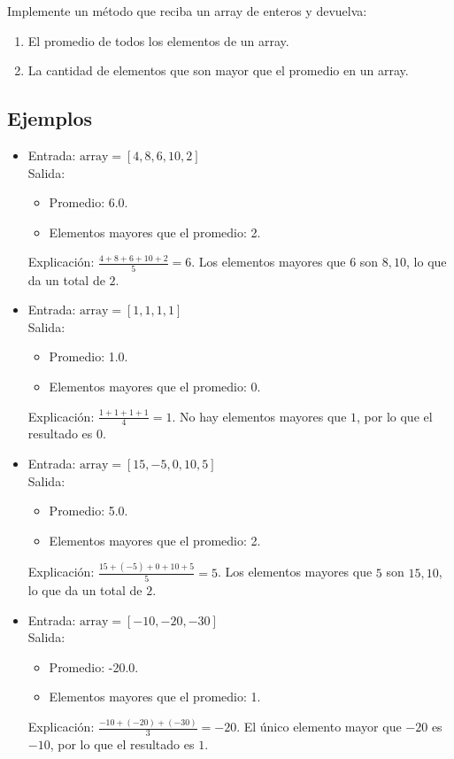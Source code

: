 Implemente un método que reciba un array de enteros y devuelva: 
\begin{enumerate}
    \item El promedio de todos los elementos de un array.
    \item La cantidad de elementos que son mayor que el promedio en un array.
\end{enumerate}
\subsection*{Ejemplos}
\begin{itemize}
    \item Entrada: \( \text{array} = [4, 8, 6, 10, 2] \)\\
    Salida: 
    \begin{itemize}
        \item Promedio: 6.0.
        \item Elementos mayores que el promedio: 2.
    \end{itemize}
    Explicación: \(\frac{4 + 8 + 6 + 10 + 2}{5} = 6\).  
    Los elementos mayores que \( 6 \) son \( 8, 10 \), lo que da un total de \( 2 \).

    \item Entrada: \( \text{array} = [1, 1, 1, 1] \)\\
    Salida: 
    \begin{itemize}
        \item Promedio: 1.0.
        \item Elementos mayores que el promedio: 0.
    \end{itemize}
    Explicación: \(\frac{1 + 1 + 1 + 1}{4} = 1\).  
    No hay elementos mayores que \( 1 \), por lo que el resultado es \( 0 \).

    \item Entrada: \( \text{array} = [15, -5, 0, 10, 5] \)\\
    Salida: 
    \begin{itemize}
        \item Promedio: 5.0.
        \item Elementos mayores que el promedio: 2.
    \end{itemize}
    Explicación: \(\frac{15 + (-5) + 0 + 10 + 5}{5} = 5\).  
    Los elementos mayores que \( 5 \) son \( 15, 10 \), lo que da un total de \( 2 \).

    \item Entrada: \( \text{array} = [-10, -20, -30] \)\\
    Salida: 
    \begin{itemize}
        \item Promedio: -20.0.
        \item Elementos mayores que el promedio: 1.
    \end{itemize}
    Explicación: \(\frac{-10 + (-20) + (-30)}{3} = -20\).  
    El único elemento mayor que \( -20 \) es \( -10 \), por lo que el resultado es \( 1 \).
\end{itemize}